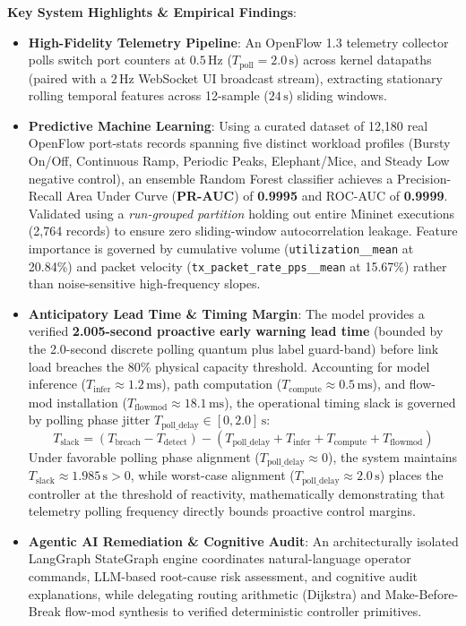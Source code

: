 \documentclass[11pt,a4paper,oneside]{report}
\begin{document}
\noindent\textbf{Key System Highlights \& Empirical Findings}:
\begin{itemize}[leftmargin=1.2em,itemsep=2pt,topsep=3pt,parsep=0pt]
  \item \textbf{High-Fidelity Telemetry Pipeline}: An OpenFlow 1.3 telemetry collector polls switch port counters at $0.5\,\text{Hz}$ ($T_{\text{poll}} = 2.0\,\text{s}$) across kernel datapaths (paired with a $2\,\text{Hz}$ WebSocket UI broadcast stream), extracting stationary rolling temporal features across 12-sample ($24\,\text{s}$) sliding windows.
  \item \textbf{Predictive Machine Learning}: Using a curated dataset of 12,180 real OpenFlow port-stats records spanning five distinct workload profiles (Bursty On/Off, Continuous Ramp, Periodic Peaks, Elephant/Mice, and Steady Low negative control), an ensemble Random Forest classifier achieves a Precision-Recall Area Under Curve (\textbf{PR-AUC}) of \textbf{0.9995} and ROC-AUC of \textbf{0.9999}. Validated using a \textit{run-grouped partition} holding out entire Mininet executions (2,764 records) to ensure zero sliding-window autocorrelation leakage. Feature importance is governed by cumulative volume (\texttt{utilization\_\_mean} at 20.84\%) and packet velocity (\texttt{tx\_packet\_rate\_pps\_\_mean} at 15.67\%) rather than noise-sensitive high-frequency slopes.
  \item \textbf{Anticipatory Lead Time \& Timing Margin}: The model provides a verified \textbf{2.005-second proactive early warning lead time} (bounded by the 2.0-second discrete polling quantum plus label guard-band) before link load breaches the 80\% physical capacity threshold. Accounting for model inference ($T_{\text{infer}} \approx 1.2\,\text{ms}$), path computation ($T_{\text{compute}} \approx 0.5\,\text{ms}$), and flow-mod installation ($T_{\text{flowmod}} \approx 18.1\,\text{ms}$), the operational timing slack is governed by polling phase jitter $T_{\text{poll\_delay}} \in [0, 2.0]\,\text{s}$:
  \[
    T_{\text{slack}} = (T_{\text{breach}} - T_{\text{detect}}) - (T_{\text{poll\_delay}} + T_{\text{infer}} + T_{\text{compute}} + T_{\text{flowmod}})
  \]
  Under favorable polling phase alignment ($T_{\text{poll\_delay}} \approx 0$), the system maintains $T_{\text{slack}} \approx 1.985\,\text{s} > 0$, while worst-case alignment ($T_{\text{poll\_delay}} \approx 2.0\,\text{s}$) places the controller at the threshold of reactivity, mathematically demonstrating that telemetry polling frequency directly bounds proactive control margins.
  \item \textbf{Agentic AI Remediation \& Cognitive Audit}: An architecturally isolated LangGraph StateGraph engine coordinates natural-language operator commands, LLM-based root-cause risk assessment, and cognitive audit explanations, while delegating routing arithmetic (Dijkstra) and Make-Before-Break flow-mod synthesis to verified deterministic controller primitives.

\end{itemize}
\end{document}
